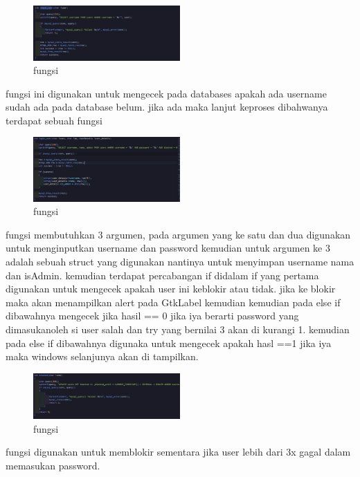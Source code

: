 \documentclass[a4paper,12pt]{article}
\begin{document}
\begin{figure}[!htbp]
    \centering
    \includegraphics[width=0.5\textwidth]{./img/check_user_mysql.png}
    \caption{fungsi \texttt{}}
\end{figure}
\FloatBarrier
fungsi \texttt{} ini digunakan untuk mengecek pada databases apakah ada username sudah ada pada database belum.
jika ada maka lanjut keproses dibahwanya terdapat sebuah fungsi \texttt{} 
\begin{figure}[!htbp]
    \centering
    \includegraphics[width=0.5\textwidth]{./img/login_user_mysql.png}
    \caption{fungsi \texttt{}}
\end{figure}
\FloatBarrier
fungsi \texttt{} membutuhkan 3 argumen, pada argumen yang ke satu dan dua digunakan untuk menginputkan username dan password kemudian untuk argumen ke 3 adalah sebuah struct yang digunakan nantinya untuk menyimpan username nama dan isAdmin.
kemudian terdapat percabangan if didalam if yang pertama digunakan untuk mengecek apakah user ini keblokir atau tidak.
jika ke blokir maka akan menampilkan alert pada GtkLabel kemudian kemudian pada else if dibawahnya mengecek jika hasil == 0  jika iya berarti password yang dimasukanoleh si user salah dan try yang bernilai 3 akan di kurangi 1.
kemudian pada else if dibawahnya digunaka untuk mengecek apakah hasl ==1 jika iya maka windows selanjunya akan di tampilkan.
\begin{figure}[!htbp]
    \centering
    \includegraphics[width=0.5\textwidth]{./img/blocked_mysql.png}
    \caption{fungsi \texttt{}}
\end{figure}
\FloatBarrier
fungsi \texttt{} digunakan untuk memblokir sementara jika user lebih dari 3x gagal dalam memasukan password. 
\end{document}

